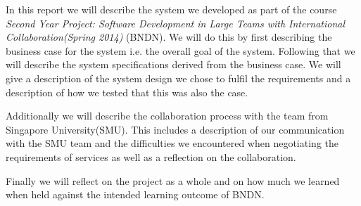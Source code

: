 \documentclass[../report.tex]{subfiles}
\begin{document}
In this report we will describe the system we developed as part of the course \textit{Second Year Project: Software Development in Large Teams with International Collaboration(Spring 2014)} (BNDN). We will do this by first describing the business case for the system i.e. the overall goal of the system. Following that we will describe the system specifications derived from the business case. We will give a description of the system design we chose to fulfil the requirements and a description of how we tested that this was also the case.

Additionally we will describe the collaboration process with the team from Singapore University(SMU). This includes a description of our communication with the SMU team and the difficulties we encountered when negotiating the requirements of services as well as a reflection on the collaboration.

Finally we will reflect on the project as a whole and on how much we learned when held against the intended learning outcome of BNDN.
\end{document}
